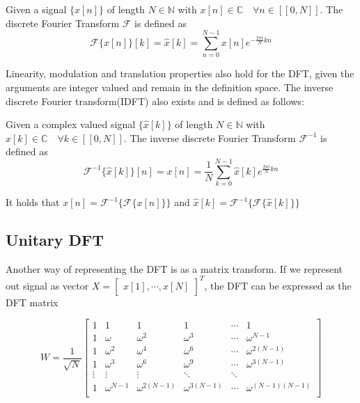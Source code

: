 \begin{definition}
    Given a signal $\{x[n] \}$ of length $N \in \mathbb{N}$ with $x[n] \in \mathbb{C} \quad \forall n \in [\![0, N]\!]$. 
    The discrete Fourier Transform $\mathscr{F}$ is defined as 
    \begin{equation}
        \mathscr{F}\{x[n]\}[k] = \widehat{x}[k] = \sum_{n=0}^{N-1} x[n] e^{-\frac{2\pi i}{N} kn}
    \end{equation}
    \label{eq:dft}
\end{definition}

Linearity, modulation and translation properties also hold for the DFT, given the arguments are integer valued and remain in the definition space.
The inverse discrete Fourier transform(IDFT) also exists and is defined as follows:

\begin{definition}
    Given a complex valued signal $\{ \widehat{x}[k] \}$ of length $N \in \mathbb{N}$ with $\widehat{x}[k] \in \mathbb{C} \quad \forall k \in [\![0, N]\!]$.
    The inverse discrete Fourier Transform $\mathscr{F}^{-1}$ is defined as 
    \begin{equation}
        \mathscr{F}^{-1}\{ \widehat{x}[k] \}[n] = x[n] = \frac{1}{N} \sum_{k=0}^{N-1} \widehat{x}[k] e^{\frac{2\pi i}{N}kn}
    \end{equation}
\end{definition}

It holds that $x[n] = \mathscr{F}^{-1} \{\mathscr{F} \{x[n]\}\}$ and $\widehat{x}[k]= \mathscr{F}^{-1} \{\mathscr{F} \{\widehat{x}[k]\}\}$

\subsection{Unitary DFT}\label{sec:unitary_dft}

Another way of representing the DFT is as a matrix transform. If we represent out signal as vector $X =  \begin{bmatrix}x[1], \cdots, x[N] \end{bmatrix}^T$,
the DFT can be expressed as the DFT matrix

\begin{equation}
    W = \frac{1}{\sqrt{N}}
    \begin{bmatrix}
        1 & 1 & 1 & 1 & \cdots & 1 \\
        1 & \omega & \omega^2 & \omega^3 & \cdots & \omega^{N-1} \\
        1 & \omega^2 & \omega^4 & \omega^6 & \cdots & \omega^{2(N-1)} \\
        1 & \omega^3 & \omega^6 & \omega^9 & \cdots & \omega^{3(N-1)} \\
        \vdots & \vdots & \vdots & \ddots & \ddots \\
        1 & \omega^{N-1} & \omega^{2(N-1)} & \omega^{3(N-1)} & \cdots & \omega^{(N-1)(N-1)} \\
    \end{bmatrix}
    \label{eq:dft_matrix}
\end{equation}

